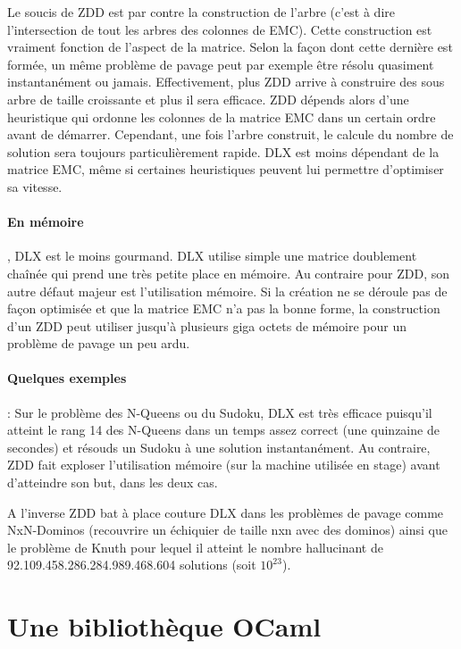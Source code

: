 \documentclass[a4paper]{article}
\begin{document}
Le soucis de ZDD est par contre la construction de l'arbre 
(c'est à dire l'intersection de tout les arbres des colonnes de EMC). 
Cette construction
est vraiment fonction de l'aspect de la matrice. Selon la façon dont cette 
dernière est formée, un même problème de pavage peut par exemple être 
résolu quasiment instantanément ou jamais. Effectivement, plus ZDD arrive à 
construire des sous arbre de taille croissante et plus il sera efficace.
ZDD dépends alors d'une heuristique
qui ordonne les colonnes de la matrice EMC dans un certain ordre 
avant de démarrer.
Cependant, une fois l'arbre construit, le calcule du nombre de solution sera
toujours particulièrement rapide.
DLX est moins dépendant 
de la matrice EMC,
même si certaines heuristiques peuvent lui permettre d'optimiser sa vitesse.

\paragraph{En mémoire}

, DLX est le moins gourmand. DLX utilise simple une 
matrice doublement chaînée qui 
prend une très petite place en mémoire. Au contraire pour ZDD, son autre
défaut majeur est l'utilisation mémoire. Si la création ne se déroule 
pas de façon optimisée et que la matrice EMC n'a pas la bonne forme, 
la construction d'un ZDD peut 
utiliser jusqu'à plusieurs giga octets de mémoire pour un problème de pavage
un peu ardu. 

\paragraph{Quelques exemples}

: Sur le problème des N-Queens ou du Sudoku, DLX est très efficace 
puisqu'il atteint le rang 14 des N-Queens dans un temps assez correct 
(une quinzaine de secondes) et résouds un Sudoku à une solution instantanément. 
Au contraire, ZDD fait exploser l'utilisation
mémoire (sur la machine utilisée en stage) avant d'atteindre son but, dans les 
deux cas.

A l'inverse ZDD bat à place couture DLX dans les problèmes de pavage comme 
NxN-Dominos (recouvrire un échiquier de taille nxn avec des dominos) ainsi que
le problème de Knuth \cite[ex. 130, p252]{taocp4a} pour lequel il atteint le nombre 
hallucinant de 92.109.458.286.284.989.468.604 solutions (soit $10^{23}$). 


\section{Une bibliothèque OCaml}
\end{document}
